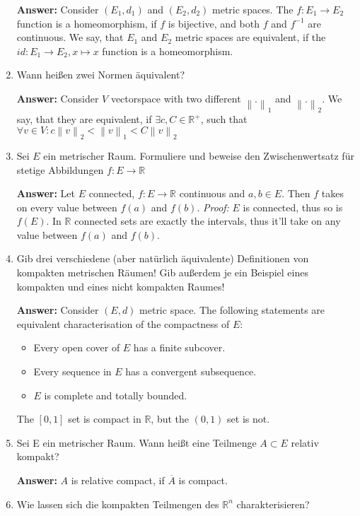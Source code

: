 \documentclass[11pt]{article}
\newcommand{\norm}[1]{\left\lVert#1\right\rVert}
\newcommand{\RR}[0]{\mathbb{R}}
\begin{document}
\begin{enumerate}
    \textbf{Answer:} Consider $(E_1, d_1)$ and $(E_2, d_2)$ metric spaces. The $f\colon E_1 \to E_2$ function is a homeomorphism, if $f$ is bijective, and both $f$ and $f^{-1}$ are continuous. We say, that $E_1$ and $E_2$ metric spaces are equivalent, if the $id: E_1 \to E_2, x \mapsto x$ function is a homeomorphism.

    \item Wann heißen zwei Normen äquivalent?

    \textbf{Answer:} Consider $V$ vectorspace with two different $\norm{.}_1$ and $\norm{.}_2$. We say, that they are equivalent, if $\exists c, C \in \RR^+$, such that $\forall v \in V\colon c \norm{v}_2 < \norm{v}_1 < C \norm{v}_2$

    \item Sei $E$ ein metrischer Raum. Formuliere und beweise den Zwischenwertsatz für stetige Abbildungen $f\colon E \to \RR$

    \textbf{Answer:} Let $E$ connected, $f\colon E \to \RR$ continuous and $a, b \in E$. Then $f$ takes on every value between $f(a)$ and $f(b)$. \textit{Proof:} $E$ is connected, thus so is $f(E)$. In $\RR$ connected sets are exactly the intervals, thus it'll take on any value between $f(a)$ and $f(b)$.

    \item Gib drei verschiedene (aber natürlich äquivalente) Definitionen von kompakten metrischen Räumen! Gib außerdem je ein Beispiel eines kompakten und eines nicht kompakten Raumes!

    \textbf{Answer:} Consider $(E, d)$ metric space. The following statements are equivalent characterisation of the compactness of $E$:
    \begin{itemize}
        \item Every open cover of $E$ has a finite subcover.
        \item Every sequence in $E$ has a convergent subsequence.
        \item $E$ is complete and totally bounded.
    \end{itemize}

    The $[0, 1]$ set is compact in $\RR$, but the $(0, 1)$ set is not.

    \item Sei E ein metrischer Raum. Wann heißt eine Teilmenge $A \subset E$ relativ kompakt?

    \textbf{Answer:} $A$ is relative compact, if $\overline{A}$ is compact.

    \item Wie lassen sich die kompakten Teilmengen des $\RR^n$
    charakterisieren?


\end{enumerate}
\end{document}
